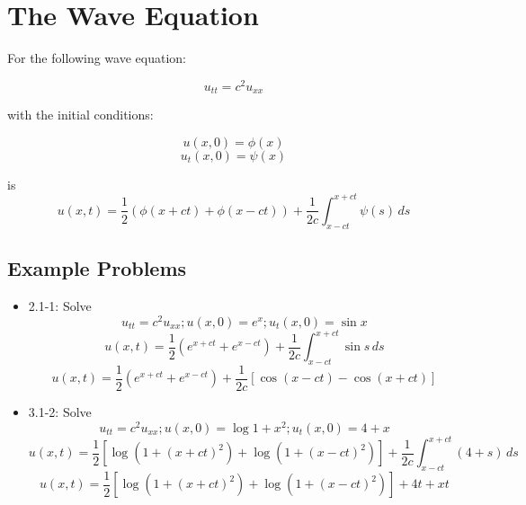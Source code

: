 \documentclass{article}
\begin{document}
\section{The Wave Equation}

For the following wave equation:

$$u_{tt} = c^2u_{xx}$$

with the initial conditions:

$$u(x,0) = \phi(x)$$
$$u_t(x,0) = \psi(x)$$

is
$$u(x,t) = \frac{1}{2}\left(\phi(x + ct) + \phi(x-ct)\right) + \frac{1}{2c} \int_{x-ct}^{x+ct} \psi(s) \,ds $$


\subsection{Example Problems}
\begin{itemize}

    \item 2.1-1:
    Solve $$u_{tt} = c^2u_{xx} ; u(x,0) = e^x ; u_t(x,0) = \sin{x}$$
    $$u(x,t) = \frac{1}{2}\left(e^{x + ct} + e^{x - ct}\right) + \frac{1}{2c}\int_{x-ct}^{x+ct} \sin{s} \,ds$$
$$u(x,t) =  \frac{1}{2}\left(e^{x + ct} + e^{x - ct}\right) + \frac{1}{2c} [\cos{(x-ct)}-\cos{(x+ct)}] $$
    \item 3.1-2:
    Solve $$u_{tt} = c^2u_{xx} ; u(x,0) = \log{1 + x^2} ; u_t(x,0) = 4 + x$$
    $$u(x,t) = \frac{1}{2}\left[\log{\left(1 + (x + ct)^2\right)}+\log{\left(1 + (x - ct)^2\right)}\right] + \frac{1}{2c}\int_{x-ct}^{x+ct} (4+s) \,ds$$    
    $$u(x,t) = \frac{1}{2}\left[\log{\left(1 + (x + ct)^2\right)}+\log{\left(1 + (x - ct)^2\right)}\right] + 4t + xt$$   
\end{itemize}
\end{document}
